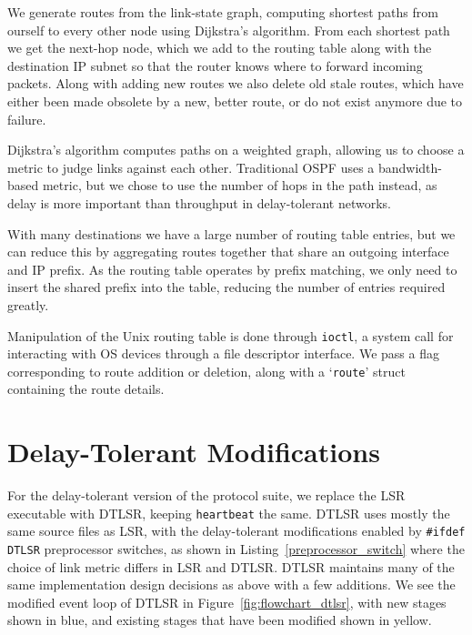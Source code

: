 \documentclass[withindex,glossary,openany]{cam-thesis}
\begin{document}
We generate routes from the link-state graph, computing shortest paths from ourself to every other node using Dijkstra's algorithm. From each shortest path we get the next-hop node, which we add to the routing table along with the destination IP subnet so that the router knows where to forward incoming packets. Along with adding new routes we also delete old stale routes, which have either been made obsolete by a new, better route, or do not exist anymore due to failure.

Dijkstra's algorithm computes paths on a weighted graph, allowing us to choose a metric to judge links against each other. Traditional OSPF uses a bandwidth-based metric, but we chose to use the number of hops in the path instead, as delay is more important than throughput in delay-tolerant networks.

With many destinations we have a large number of routing table entries, but we can reduce this by aggregating routes together that share an outgoing interface and IP prefix. As the routing table operates by prefix matching, we only need to insert the shared prefix into the table, reducing the number of entries required greatly.

Manipulation of the Unix routing table is done through \texttt{ioctl}, a system call for interacting with OS devices through a file descriptor interface. We pass a flag corresponding to route addition or deletion, along with a `\texttt{route}' struct containing the route details.

\section{Delay-Tolerant Modifications}

For the delay-tolerant version of the protocol suite, we replace the LSR executable with DTLSR, keeping \texttt{heartbeat} the same. DTLSR uses mostly the same source files as LSR, with the delay-tolerant modifications enabled by \texttt{\#ifdef DTLSR} preprocessor switches, as shown in Listing~\ref{preprocessor_switch} where the choice of link metric differs in LSR and DTLSR. DTLSR maintains many of the same implementation design decisions as above with a few additions. We see the modified event loop of DTLSR in Figure~\ref{fig:flowchart_dtlsr}, with new stages shown in blue, and existing stages that have been modified shown in yellow.
\end{document}
